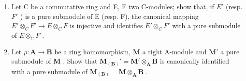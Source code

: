 \begin{enumerate}
\item
  Let C be a commutative ring and E, F two C-modules; show that, if \(E'\) (resp. \(F'\) ) is a pure submodule of E (resp. F), the canonical mapping \(E' \otimes_{C} F' \to E \otimes_{C} F\) is injective and identifies \(E' \otimes_{C} F'\) with a pure submodule of \(E \otimes_{C} F\) .
\item
  Let \(\rho: \mathbf{A} \to \mathbf{B}\) be a ring homomorphism, \(\mathbf{M}\) a right A-module and \(\mathbf{M}'\) a pure submodule of \(\mathbf{M}\) . Show that \(\mathbf{M}_{(\mathbf{B})}' = \mathbf{M}' \otimes_{\mathbf{A}} \mathbf{B}\) is canonically identified with a pure submodule of \(\mathbf{M}_{(\mathbf{B})} = \mathbf{M} \otimes_{\mathbf{A}} \mathbf{B}\) .
\end{enumerate}

